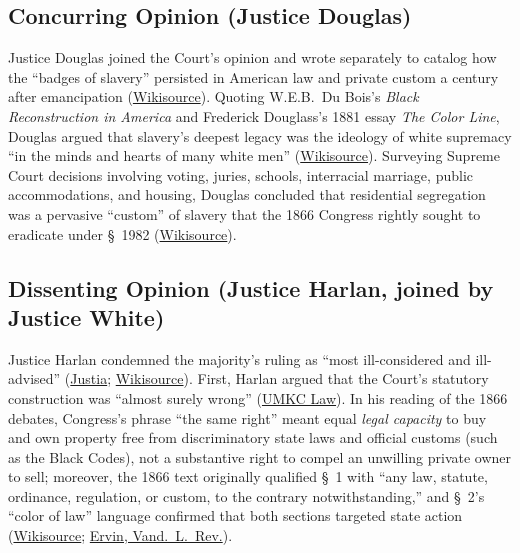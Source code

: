 \documentclass[12pt]{article}
\begin{document}
\subsection{Concurring Opinion (Justice Douglas)}

Justice Douglas joined the Court's opinion and wrote separately to catalog how the ``badges of slavery'' persisted in American law and private custom a century after emancipation (\href{https://en.wikisource.org/wiki/Jones_v._Alfred_H._Mayer_Co./Concurrence_Douglas}{Wikisource}). Quoting W.E.B.\ Du Bois's \textit{Black Reconstruction in America} and Frederick Douglass's 1881 essay \textit{The Color Line}, Douglas argued that slavery's deepest legacy was the ideology of white supremacy ``in the minds and hearts of many white men'' (\href{https://en.wikisource.org/wiki/Jones_v._Alfred_H._Mayer_Co./Concurrence_Douglas}{Wikisource}). Surveying Supreme Court decisions involving voting, juries, schools, interracial marriage, public accommodations, and housing, Douglas concluded that residential segregation was a pervasive ``custom'' of slavery that the 1866 Congress rightly sought to eradicate under \S~1982 (\href{https://en.wikisource.org/wiki/Jones_v._Alfred_H._Mayer_Co./Concurrence_Douglas}{Wikisource}).

\subsection{Dissenting Opinion (Justice Harlan, joined by Justice White)}

Justice Harlan condemned the majority's ruling as ``most ill-considered and ill-advised'' (\href{https://supreme.justia.com/cases/federal/us/392/409/}{Justia}; \href{https://en.wikisource.org/wiki/Jones_v._Mayer/Dissent_Harlan}{Wikisource}). First, Harlan argued that the Court's statutory construction was ``almost surely wrong'' (\href{http://law2.umkc.edu/faculty/projects/ftrials/conlaw/mayer.html}{UMKC Law}). In his reading of the 1866 debates, Congress's phrase ``the same right'' meant equal \emph{legal capacity} to buy and own property free from discriminatory state laws and official customs (such as the Black Codes), not a substantive right to compel an unwilling private owner to sell; moreover, the 1866 text originally qualified \S~1 with ``any law, statute, ordinance, regulation, or custom, to the contrary notwithstanding,'' and \S~2's ``color of law'' language confirmed that both sections targeted state action (\href{https://en.wikisource.org/wiki/Jones_v._Mayer/Dissent_Harlan}{Wikisource}; \href{https://scholarship.law.vanderbilt.edu/cgi/viewcontent.cgi?article=3460&context=vlr}{Ervin, Vand.\ L.\ Rev.}).
\end{document}
